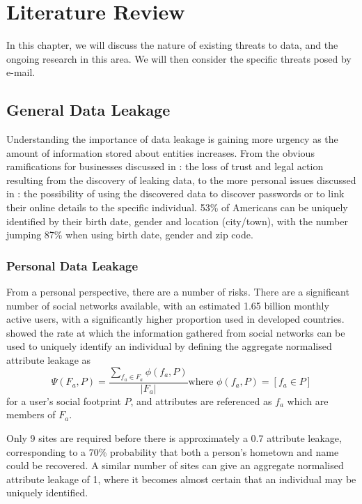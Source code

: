 \chapter{Literature Review}\label{chap:exres}

In this chapter, we will discuss the nature of existing threats to data, and
the ongoing research in this area.  We will then consider the specific threats
posed by e-mail.

\section{General Data Leakage}

Understanding the importance of data leakage is gaining more urgency as the
amount of information stored about entities increases.  From the obvious
ramifications for businesses discussed in \cite{papadimitriou2011data}: the
loss of trust and legal action resulting from the discovery of leaking data, to
the more personal issues discussed in \cite{irani2011modeling}: the possibility
of using the discovered data to discover passwords or to link their online
details to the specific individual.  53\% of Americans can be uniquely
identified by their birth date, gender and location (city/town), with the
number jumping 87\% when using birth date, gender and zip code.

\subsection{Personal Data Leakage}

From a personal perspective, there are a number of risks.  There are a
significant number of social networks available, with an estimated 1.65 billion
monthly active users, with a significantly higher proportion used in developed
countries.  \cite{irani2011modeling} showed the rate at which the information
gathered from social networks can be used to uniquely identify an individual by
defining the aggregate normalised attribute leakage as
\[\Psi(F_a,P)=\frac{\sum_{f_a\in F_a}\phi\left(f_a, P\right)}{|F_a|} \text{
		where }\phi\left(f_a, P\right) = \left[f_a\in P\right]\] for a
user's social footprint $P$, and attributes are referenced as $f_a$ which are
members of $F_a$.

Only 9 sites are required before there is approximately a 0.7 attribute
leakage, corresponding to a 70\% probability that both a person's hometown and
name could be recovered.  A similar number of sites can give an aggregate
normalised attribute leakage of 1, where it becomes almost certain that an
individual may be uniquely identified.

